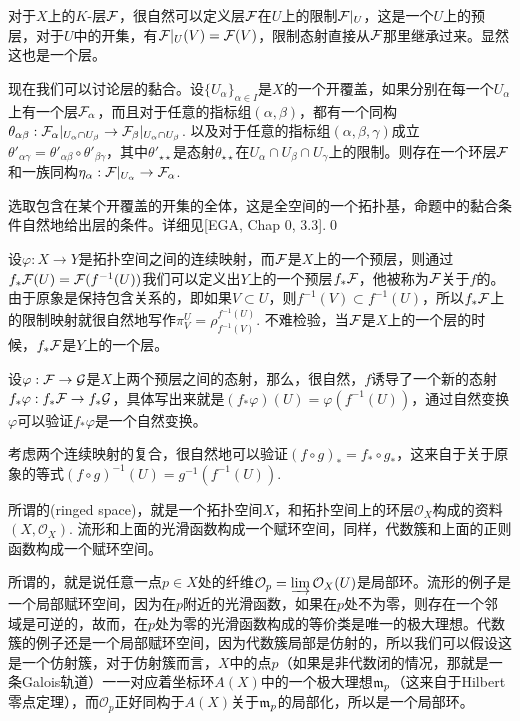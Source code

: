\para 对于$X$上的$K$-层$\mathcal{F}$，很自然可以定义层$\mathcal{F}$在$U$上的限制$\mathcal{F}|_U$，这是一个$U$上的预层，对于$U$中的开集，有$\mathcal{F}|_U(V)=\mathcal{F}(V)$，限制态射直接从$\mathcal{F}$那里继承过来。显然这也是一个层。

\pro 现在我们可以讨论层的黏合。设$\{U_\alpha\}_{\alpha \in I}$是$X$的一个开覆盖，如果分别在每一个$U_\alpha$上有一个层$\mathcal{F}_\alpha$，而且对于任意的指标组$(\alpha,\beta)$，都有一个同构$\theta_{\alpha\beta}:\mathcal{F}_\alpha|_{U_\alpha\cap U_\beta}\to \mathcal{F}_\beta|_{U_\alpha\cap U_\beta}$. 以及对于任意的指标组$(\alpha,\beta,\gamma)$成立$\theta'_{\alpha\gamma}=\theta'_{\alpha\beta}\circ \theta'_{\beta\gamma}$，其中$\theta'_{\star\star}$是态射$\theta_{\star\star}$在$U_\alpha\cap U_\beta \cap U_\gamma$上的限制。则存在一个环层$\mathcal{F}$和一族同构$\eta_\alpha:\mathcal{F}|_{U_\alpha}\to \mathcal{F}_\alpha$.

\proof 选取包含在某个开覆盖的开集的全体，这是全空间的一个拓扑基，命题中的黏合条件自然地给出层的条件。详细见[EGA, Chap 0, 3.3].\qed

\para 设$\varphi:X\to Y$是拓扑空间之间的连续映射，而$\mathcal{F}$是$X$上的一个预层，则通过$f_*\mathcal{F}(U)=\mathcal{F}(f^{-1}(U))$我们可以定义出$Y$上的一个预层$f_*\mathcal{F}$，他被称为$\mathcal{F}$关于$f$的。 由于原象是保持包含关系的，即如果$V\subset U$，则$f^{-1}(V)\subset f^{-1}(U)$，所以$f_*\mathcal{F}$上的限制映射就很自然地写作$\pi^U_V=\rho^{f^{-1}(U)}_{f^{-1}(V)}$. 不难检验，当$\mathcal{F}$是$X$上的一个层的时候，$f_*\mathcal{F}$是$Y$上的一个层。

设$\varphi:\mathcal{F}\to\mathcal{G}$是$X$上两个预层之间的态射，那么，很自然，$f$诱导了一个新的态射$f_*\varphi:f_*\mathcal{F}\to f_*\mathcal{G}$，具体写出来就是$(f_*\varphi)(U)=\varphi(f^{-1}(U))$，通过自然变换$\varphi$可以验证$f_*\varphi$是一个自然变换。

考虑两个连续映射的复合，很自然地可以验证$(f\circ g)_*=f_*\circ g_*$，这来自于关于原象的等式$(f\circ g)^{-1}(U)=g^{-1}(f^{-1}(U))$.

\para 所谓的(ringed space)，就是一个拓扑空间$X$，和拓扑空间上的环层$\mathcal{O}_X$构成的资料$(X,\mathcal{O}_X)$. 流形和上面的光滑函数构成一个赋环空间，同样，代数簇和上面的正则函数构成一个赋环空间。

所谓的，就是说任意一点$p\in X$处的纤维$\mathcal{O}_p=\varinjlim \mathcal{O}_X(U)$是局部环。流形的例子是一个局部赋环空间，因为在$p$附近的光滑函数，如果在$p$处不为零，则存在一个邻域是可逆的，故而，在$p$处为零的光滑函数构成的等价类是唯一的极大理想。代数簇的例子还是一个局部赋环空间，因为代数簇局部是仿射的，所以我们可以假设这是一个仿射簇，对于仿射簇而言，$X$中的点$p$（如果是非代数闭的情况，那就是一条Galois轨道）一一对应着坐标环$A(X)$中的一个极大理想$\mathfrak{m}_p$（这来自于Hilbert零点定理），而$\mathcal{O}_p$正好同构于$A(X)$关于$\mathfrak{m}_p$的局部化，所以是一个局部环。

